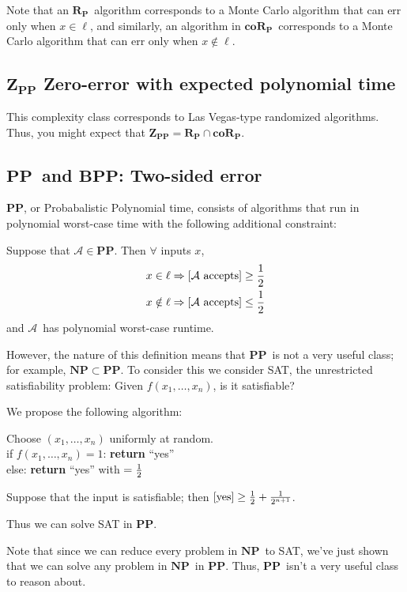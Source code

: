 \documentclass[11pt]{article}
\let\Pr\relax
\DeclareMathOperator*{\Pr}{\mathbb{P}}
\newcommand{\NP}{\ensuremath{\mathbf{NP}}}
\newcommand{\PP}{\ensuremath{\mathbf{PP}}}
\newcommand{\BPP}{\ensuremath{\mathbf{BPP}}}
\newcommand{\ZPP}{\ensuremath{\mathbf{Z_{PP}}}}
\newcommand{\RP}{\ensuremath{\mathbf{R_{P}}}}
\newcommand{\coRP}{\ensuremath{\mathbf{coR_{P}}}}
\newcommand{\Alg}{\ensuremath{\mathcal{A}}}
\begin{document}
Note that an \RP\ algorithm corresponds to a Monte Carlo algorithm that can err only when $x \in \ell$, and similarly, an algorithm in \coRP\ corresponds to a Monte Carlo algorithm that can err only when $x \notin \ell$. 

\subsection{\ZPP\: Zero-error with expected polynomial time}

This complexity class corresponds to Las Vegas-type randomized algorithms. Thus, you might expect that $\ZPP = \RP \cap \coRP$.

\subsection{\PP\ and \BPP: Two-sided error }

\PP, or Probabalistic Polynomial time, consists of algorithms that run in polynomial worst-case time with the following additional constraint:

Suppose that $\Alg\in\PP$. Then $\forall$ inputs $x$,
\begin{align*}
  x \in \ell &\Rightarrow \Pr[\Alg \text{ accepts}] \ge \frac{1}{2} \\
  x \notin \ell &\Rightarrow \Pr[\Alg \text{ accepts}] \le \frac{1}{2} \\
\end{align*}
and \Alg\ has polynomial worst-case runtime.

However, the nature of this definition means that \PP\ is not a very useful class; for example, $\NP\subset\PP$. To consider this we consider SAT, the unrestricted satisfiability problem: Given $f(x_1, \dots, x_n)$, is it satisfiable?

We propose the following algorithm: %

Choose $(x_1, \dots, x_n)$ uniformly at random. \\
 if $f(x_1, \dots, x_n) = 1$: \textbf{return} ``yes''\\
 else: \textbf{return} ``yes'' with $\Pr = \frac{1}{2}$

Suppose that the input is satisfiable; then $\Pr[\text{yes}] \geq \frac{1}{2} + \frac{1}{2^{n+1}}$.

Thus we can solve SAT in \PP.

Note that since we can reduce every problem in \NP\ to SAT, we've just shown that we can solve any problem in \NP\ in \PP. Thus, \PP\ isn't a very useful class to reason about.
\end{document}
